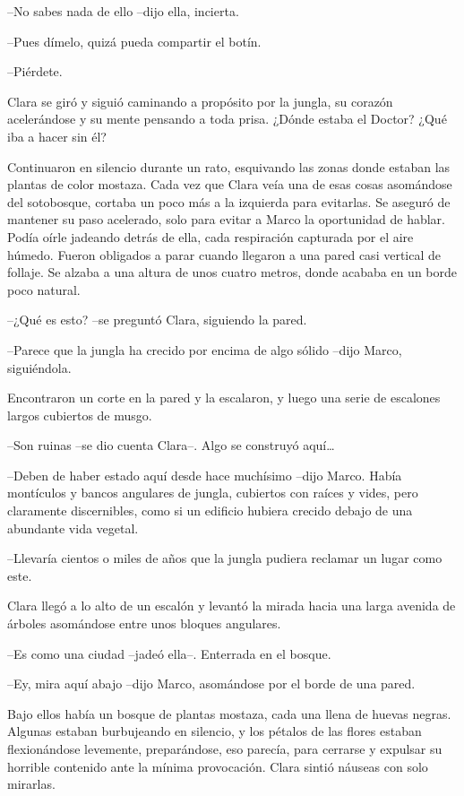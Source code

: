 {--No sabes nada de ello --dijo ella, incierta.}

{--Pues dímelo, quizá pueda compartir el botín.}

{--Piérdete.}

{Clara se giró y siguió caminando a propósito por la jungla, su corazón
 acelerándose y su mente pensando a toda prisa. ¿Dónde estaba el Doctor?
¿Qué iba a hacer sin él?}

{Continuaron en silencio durante un rato, esquivando las zonas donde
 estaban las plantas de color mostaza. Cada vez que Clara veía una de
 esas cosas asomándose del sotobosque, cortaba un poco más a la izquierda
 para evitarlas. Se aseguró de mantener su paso acelerado, solo para
 evitar a Marco la oportunidad de hablar. Podía oírle jadeando detrás de
 ella, cada respiración capturada por el aire húmedo. Fueron obligados a
 parar cuando llegaron a una pared casi vertical de follaje. Se alzaba a
 una altura de unos cuatro metros, donde acababa en un borde poco
natural.}

{--¿Qué es esto? --se preguntó Clara, siguiendo la pared.}

{--Parece que la jungla ha crecido por encima de algo sólido --dijo
Marco, siguiéndola.}

{Encontraron un corte en la pared y la escalaron, y luego una serie de
escalones largos cubiertos de musgo.}

{--Son ruinas --se dio cuenta Clara--. Algo se construyó aquí\ldots{}}

{--Deben de haber estado aquí desde hace muchísimo --dijo Marco. Había
 montículos y bancos angulares de jungla, cubiertos con raíces y vides,
 pero claramente discernibles, como si un edificio hubiera crecido debajo
de una abundante vida vegetal.}

{--Llevaría cientos o miles de años que la jungla pudiera reclamar un
lugar como este.}

{Clara llegó a lo alto de un escalón y levantó la mirada hacia una larga
avenida de árboles asomándose entre unos bloques angulares.}

{--Es como una ciudad --jadeó ella--. Enterrada en el bosque.}

{--Ey, mira aquí abajo --dijo Marco, asomándose por el borde de una
pared.}

{Bajo ellos había un bosque de plantas mostaza, cada una llena de huevas
 negras. Algunas estaban burbujeando en silencio, y los pétalos de las
 flores estaban flexionándose levemente, preparándose, eso parecía, para
 cerrarse y expulsar su horrible contenido ante la mínima provocación.
Clara sintió náuseas con solo mirarlas.}

